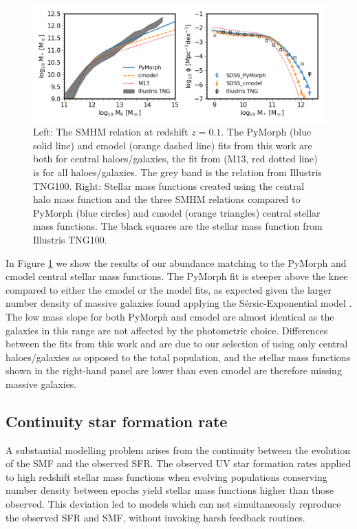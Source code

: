 \begin{figure}[h]
    \centering
    \includegraphics[width = \linewidth]{Figures/Chapter2/AbundaceMtch_Data.png}
    \caption{Left: The SMHM relation at redshift $z=0.1$. The PyMorph (blue solid line) and cmodel (orange dashed line) fits from this work are both for central haloes/galaxies, the fit from \citet{Moster2013} (M13, red dotted line) is for all haloes/galaxies. The grey band is the relation from Illustris TNG100. Right: Stellar mass functions created using the central halo mass function and the three SMHM relations compared to PyMorph (blue circles) and cmodel (orange triangles) central stellar mass functions. The black squares are the stellar mass function from Illustris TNG100.}
    \label{fig:Abn_Data}
\end{figure}

In Figure \ref{fig:Abn_Data} we show the results of our abundance matching to the PyMorph and cmodel central stellar mass functions. The PyMorph fit is steeper above the knee compared to either the cmodel or the \citet{Moster2013} model fits, as expected given the larger number density of massive galaxies found applying the S\'ersic-Exponential model \citep[eg.,][]{Shankar2014, Kravtsov2018StellarHalos}. The low mass slope for both PyMorph and cmodel are almost identical as the galaxies in this range are not affected by the photometric choice. Differences between the fits from this work and \citet{Moster2013} are due to our selection of using only central haloes/galaxies as opposed to the total population, and the stellar mass functions shown in the right-hand panel are lower than even cmodel are therefore missing massive galaxies.


\subsection{Continuity star formation rate}

A substantial modelling problem arises from the continuity between the evolution of the SMF and the observed SFR. The observed UV star formation rates applied to high redshift stellar mass functions when evolving populations conserving number density between epochs yield stellar mass functions higher than those observed. This deviation led to models which can not simultaneously reproduce the observed SFR and SMF, without invoking harsh feedback routines.

